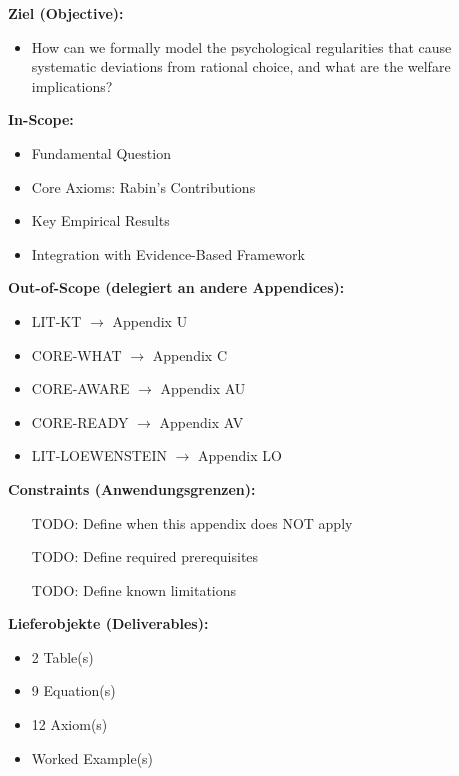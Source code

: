 \begin{tcolorbox}[
    colback=orange!5!white,
    colframe=orange!75!black,
    title={\textbf{Appendix Scope: Ziel / In-Scope / Out-of-Scope / Constraints}},
    fonttitle=\bfseries
]

\textbf{Ziel (Objective):}
\begin{itemize}[nosep]
    \item How can we formally model the psychological regularities that cause systematic deviations from rational choice, and what are the welfare implications?
\end{itemize}

\textbf{In-Scope:}
\begin{itemize}[nosep]
    \item Fundamental Question
    \item Core Axioms: Rabin's Contributions
    \item Key Empirical Results
    \item Integration with Evidence-Based Framework
\end{itemize}

\textbf{Out-of-Scope (delegiert an andere Appendices):}
\begin{itemize}[nosep]
    \item LIT-KT $\rightarrow$ Appendix U
    \item CORE-WHAT $\rightarrow$ Appendix C
    \item CORE-AWARE $\rightarrow$ Appendix AU
    \item CORE-READY $\rightarrow$ Appendix AV
    \item LIT-LOEWENSTEIN $\rightarrow$ Appendix LO
\end{itemize}

\textbf{Constraints (Anwendungsgrenzen):}
\begin{itemize}[nosep]
    \item [TODO: Define when this appendix does NOT apply]
    \item [TODO: Define required prerequisites]
    \item [TODO: Define known limitations]
\end{itemize}

\textbf{Lieferobjekte (Deliverables):}
\begin{itemize}[nosep]
    \item 2 Table(s)
    \item 9 Equation(s)
    \item 12 Axiom(s)
    \item Worked Example(s)
\end{itemize}

\end{tcolorbox}


